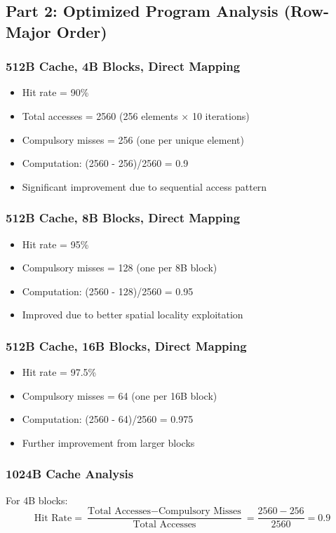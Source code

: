\documentclass{article}
\begin{document}
\subsection{Part 2: Optimized Program Analysis (Row-Major Order)}

\subsubsection{512B Cache, 4B Blocks, Direct Mapping}
\begin{itemize}
    \item Hit rate = 90\%
    \item Total accesses = 2560 (256 elements × 10 iterations)
    \item Compulsory misses = 256 (one per unique element)
    \item Computation: (2560 - 256)/2560 = 0.9
    \item Significant improvement due to sequential access pattern
\end{itemize}

\subsubsection{512B Cache, 8B Blocks, Direct Mapping}
\begin{itemize}
    \item Hit rate = 95\%
    \item Compulsory misses = 128 (one per 8B block)
    \item Computation: (2560 - 128)/2560 = 0.95
    \item Improved due to better spatial locality exploitation
\end{itemize}

\subsubsection{512B Cache, 16B Blocks, Direct Mapping}
\begin{itemize}
    \item Hit rate = 97.5\%
    \item Compulsory misses = 64 (one per 16B block)
    \item Computation: (2560 - 64)/2560 = 0.975
    \item Further improvement from larger blocks
\end{itemize}

\subsubsection{1024B Cache Analysis}
For 4B blocks:
\begin{equation*}
    \text{Hit Rate} = \frac{\text{Total Accesses} - \text{Compulsory Misses}}{\text{Total Accesses}} = \frac{2560 - 256}{2560} = 0.9
\end{equation*}
\end{document}
